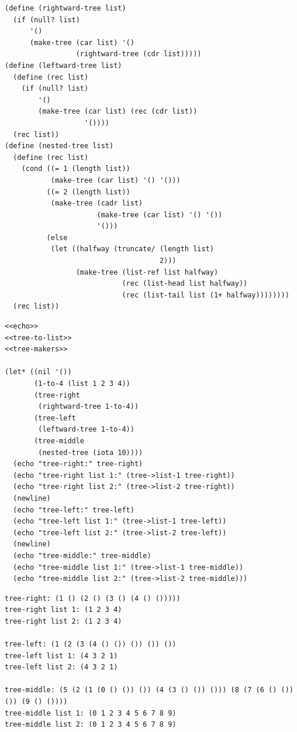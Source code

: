 \documentclass[final,fleqn,titlepage,twoside]{article}
\begin{document}
\begin{verbatim}
(define (rightward-tree list)
  (if (null? list)
      '()
      (make-tree (car list) '()
                 (rightward-tree (cdr list)))))
(define (leftward-tree list)
  (define (rec list)
    (if (null? list)
        '()
        (make-tree (car list) (rec (cdr list))
                   '())))
  (rec list))
(define (nested-tree list)
  (define (rec list)
    (cond ((= 1 (length list))
           (make-tree (car list) '() '()))
          ((= 2 (length list))
           (make-tree (cadr list)
                      (make-tree (car list) '() '())
                      '()))
          (else
           (let ((halfway (truncate/ (length list)
                                     2)))
                 (make-tree (list-ref list halfway)
                            (rec (list-head list halfway))
                            (rec (list-tail list (1+ halfway))))))))
  (rec list))
\end{verbatim}
\begin{verbatim}
<<echo>>
<<tree-to-list>>
<<tree-makers>>

(let* ((nil '())
       (1-to-4 (list 1 2 3 4))
       (tree-right
        (rightward-tree 1-to-4))
       (tree-left
        (leftward-tree 1-to-4))
       (tree-middle
        (nested-tree (iota 10))))
  (echo "tree-right:" tree-right)
  (echo "tree-right list 1:" (tree->list-1 tree-right))
  (echo "tree-right list 2:" (tree->list-2 tree-right))
  (newline)
  (echo "tree-left:" tree-left)
  (echo "tree-left list 1:" (tree->list-1 tree-left))
  (echo "tree-left list 2:" (tree->list-2 tree-left))
  (newline)
  (echo "tree-middle:" tree-middle)
  (echo "tree-middle list 1:" (tree->list-1 tree-middle))
  (echo "tree-middle list 2:" (tree->list-2 tree-middle)))
\end{verbatim}

\begin{verbatim}
tree-right: (1 () (2 () (3 () (4 () ())))) 
tree-right list 1: (1 2 3 4) 
tree-right list 2: (1 2 3 4) 

tree-left: (1 (2 (3 (4 () ()) ()) ()) ()) 
tree-left list 1: (4 3 2 1) 
tree-left list 2: (4 3 2 1) 

tree-middle: (5 (2 (1 (0 () ()) ()) (4 (3 () ()) ())) (8 (7 (6 () ()) ()) (9 () ()))) 
tree-middle list 1: (0 1 2 3 4 5 6 7 8 9) 
tree-middle list 2: (0 1 2 3 4 5 6 7 8 9) 
\end{verbatim}
\end{document}
